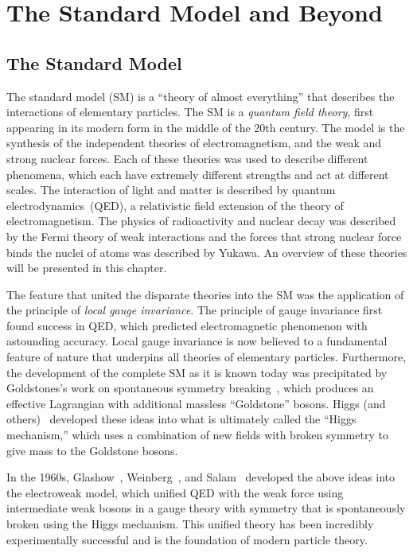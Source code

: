 \ifx\master\undefined\fi

\chapter{The Standard Model and Beyond}
\label{ch:theory}

\section{The Standard Model}
%
The standard model (SM) is a ``theory of almost everything'' that describes the
interactions of elementary particles.  The SM is a \emph{quantum
field theory}, first appearing in its modern form in the middle of the 20th
century.  The model is the synthesis of the independent theories of
electromagnetism, and the weak and strong nuclear forces.  Each of these
theories was used to describe different phenomena, which each have extremely
different strengths and act at different scales.  The interaction of light and
matter is described by quantum electrodynamics~(QED), a relativistic field
extension of the theory of electromagnetism.  The physics of radioactivity and
nuclear decay was described by the Fermi theory of weak interactions and the
forces that strong nuclear force binds the nuclei of atoms was described by
Yukawa.  An overview of these theories will be presented in this chapter.  

The feature that united the disparate theories into the SM was the
application of the principle of \emph{local gauge invariance}. The principle of
gauge invariance first found success in QED, which predicted electromagnetic
phenomenon with astounding accuracy.  Local gauge invariance is now believed to
a fundamental feature of nature that underpins all theories of elementary
particles.  Furthermore, the development of the complete SM as it is
known today was precipitated by Goldstones's work on spontaneous symmetry
breaking~\cite{Goldstone:1961eq,PhysRev.127.965}, which produces an effective
Lagrangian with additional massless ``Goldstone'' bosons.  Higgs (and
others)~\cite{PhysRevLett.13.321, PhysRevLett.13.508,PhysRevLett.13.585}
developed these ideas into what is ultimately called the ``Higgs mechanism,''
which uses a combination of new fields with broken symmetry to give mass to the
Goldstone bosons.

In the 1960s, Glashow~\cite{Glashow:1961tr}, Weinberg~\cite{Weinberg:1967tq}, 
and Salam~\cite{Salam:1968rm} developed the above ideas into the
electroweak model, which unified QED with the weak force using intermediate weak
bosons in a gauge theory with symmetry that is spontaneously broken using the Higgs
mechanism.  This unified theory has been incredibly experimentally successful
and is the foundation of modern particle theory.

